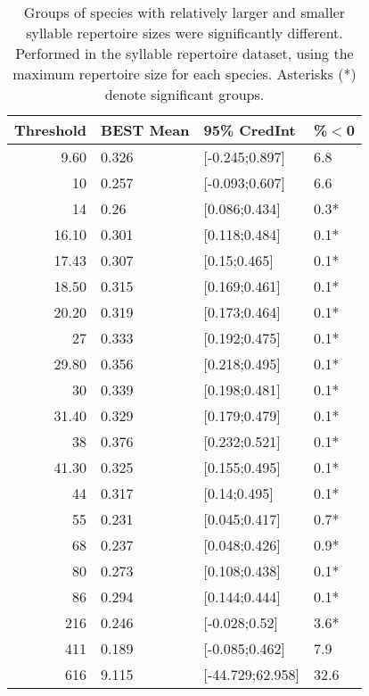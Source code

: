 \documentclass{article}
\begin{document}
  \begin{table}[H]
  \centering
  \caption{Groups of species with relatively larger and smaller syllable repertoire sizes were
  significantly different. Performed in the syllable repertoire dataset, using the maximum repertoire size for each species. Asterisks (*) denote significant groups.} 
  \begin{tabular}{rlll}
  \hline
  Threshold & BEST Mean & 95\% CredInt & \%$<$0 \\ 
  \hline
  9.60 & 0.326 & [-0.245;0.897] & 6.8 \\ 
  10 & 0.257 & [-0.093;0.607] & 6.6 \\ 
  14 & 0.26 & [0.086;0.434] & 0.3* \\ 
  16.10 & 0.301 & [0.118;0.484] & 0.1* \\ 
  17.43 & 0.307 & [0.15;0.465] & 0.1* \\ 
  18.50 & 0.315 & [0.169;0.461] & 0.1* \\ 
  20.20 & 0.319 & [0.173;0.464] & 0.1* \\ 
  27 & 0.333 & [0.192;0.475] & 0.1* \\ 
  29.80 & 0.356 & [0.218;0.495] & 0.1* \\ 
  30 & 0.339 & [0.198;0.481] & 0.1* \\ 
  31.40 & 0.329 & [0.179;0.479] & 0.1* \\ 
  38 & 0.376 & [0.232;0.521] & 0.1* \\ 
  41.30 & 0.325 & [0.155;0.495] & 0.1* \\ 
  44 & 0.317 & [0.14;0.495] & 0.1* \\ 
  55 & 0.231 & [0.045;0.417] & 0.7* \\ 
  68 & 0.237 & [0.048;0.426] & 0.9* \\ 
  80 & 0.273 & [0.108;0.438] & 0.1* \\ 
  86 & 0.294 & [0.144;0.444] & 0.1* \\ 
  216 & 0.246 & [-0.028;0.52] & 3.6* \\ 
  411 & 0.189 & [-0.085;0.462] & 7.9 \\ 
  616 & 9.115 & [-44.729;62.958] & 32.6 \\ 
  \hline
  \end{tabular}
  \end{table}
\end{document}
